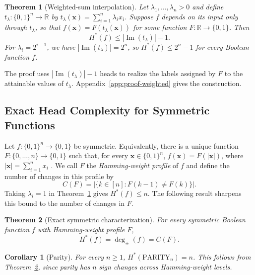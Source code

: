 \documentclass{article}
\newtheorem{theorem}{Theorem}
\theoremstyle{definition}
\theoremstyle{plain}
\newtheorem{corollary}{Corollary}
\newcommand{\hstar}{H^{\ast}}
\newcommand{\tdeg}{\deg_{\pm}}
\newcommand{\bits}{\{0,1\}}
\newcommand{\signchanges}{C(F)}
\begin{document}
\begin{theorem}[Weighted-sum interpolation]
\label{thm:weighted-upper}
Let $\lambda_1,\ldots,\lambda_n>0$ and define $t_\lambda:\bits^n\to\mathbb{R}$ by $t_\lambda(\mathbf{x})=\sum_{i=1}^{n}\lambda_i x_i$. Suppose $f$ depends on its input only through $t_\lambda$, so that $f(\mathbf{x})=F(t_\lambda(\mathbf{x}))$ for some function $F:\mathbb{R}\to\bits$. Then
\begin{equation*}
\hstar(f)\leq |\operatorname{Im}(t_\lambda)|-1.
\end{equation*}
\textnormal{For $\lambda_i=2^{i-1}$, we have $|\operatorname{Im}(t_\lambda)|=2^n$, so $\hstar(f)\leq2^n-1$ for every Boolean function $f$.}
\end{theorem}
The proof uses $|\operatorname{Im}(t_\lambda)|-1$ heads to realize the labels assigned by $F$ to the attainable values of $t_\lambda$. Appendix~\ref{app:proof-weighted} gives the construction.

\subsection{Exact Head Complexity for Symmetric Functions}

Let $f:\bits^n\to\bits$ be symmetric. Equivalently, there is a unique function $F:\{0,\ldots,n\}\to\bits$ such that, for every $\mathbf{x}\in\bits^n$, $f(\mathbf{x})=F(|\mathbf{x}|)$, where $|\mathbf{x}|=\sum_{i=1}^{n}x_i$ \citep{paturi1992degree}. We call $F$ the \emph{Hamming-weight profile} of $f$ and define the number of changes in this profile by
\begin{equation}
\signchanges=\left|\{k\in[n]:F(k-1)\neq F(k)\}\right|.
\label{eq:sign-changes}
\end{equation}
Taking $\lambda_i=1$ in Theorem~\ref{thm:weighted-upper} gives $\hstar(f)\leq n$. The following result sharpens this bound to the number of changes in $F$.

\begin{theorem}[Exact symmetric characterization]
\label{thm:symmetric}
For every symmetric Boolean function $f$ with Hamming-weight profile $F$,
\begin{equation*}
\hstar(f)=\tdeg(f)=\signchanges.
\end{equation*}
\end{theorem}

\begin{corollary}[Parity]
\label{cor:parity}
For every $n\geq1$, $\hstar(\mathrm{PARITY}_n)=n$. This follows from Theorem~\ref{thm:symmetric}, since parity has $n$ sign changes across Hamming-weight levels.
\end{corollary}
\end{document}
